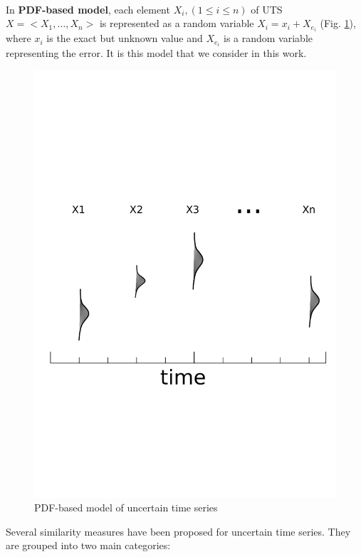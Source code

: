 \paragraph{} In \textbf{PDF-based model}, each element $X_i, (1\leq i \leq n)$ of UTS $X = <X_1, \ldots, X_n>$ is   represented as a random variable $X_i=x_i + X_{e_i}$ (Fig. \ref{pdf}), where $x_i$ is the exact but unknown value  and $X_{e_i}$ is a random variable representing the error. It is this model that we  consider in this work.
  
  \begin{figure}[h]
  \centering
   \includegraphics[scale=0.4]{images/pdf2}
  \caption{PDF-based model of uncertain time series}
  \label{pdf}
  \end{figure}
  


Several similarity measures have been proposed for uncertain time series. They are grouped into two main categories: 

